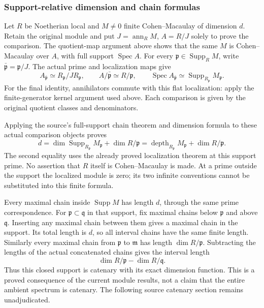 \subsubsection{Support-relative dimension and chain formulas}\label{algebra-proof-019-support-relative-dimension-and-chain-formulas}

Let \(R\) be Noetherian local and \(M\ne0\) finite Cohen--Macaulay of dimension \(d\). Retain the original module and put \(J=\operatorname{ann}_R M\), \(A=R/J\) solely to prove the comparison. The quotient-map argument above shows that the same \(M\) is Cohen--Macaulay over \(A\), with full support \(\operatorname{Spec}A\). For every \(\mathfrak p\in\operatorname{Supp}_R M\), write \(\bar{\mathfrak p}=\mathfrak p/J\). The actual prime and localization maps give \[
 A_{\bar{\mathfrak p}}\simeq R_{\mathfrak p}/JR_{\mathfrak p},\qquad
 A/\bar{\mathfrak p}\simeq R/\mathfrak p,\qquad
 \operatorname{Spec}A_{\bar{\mathfrak p}}\simeq
 \operatorname{Supp}_{R_{\mathfrak p}}M_{\mathfrak p}.
\] For the final identity, annihilators commute with this flat localization: apply the finite-generator kernel argument used above. Each comparison is given by the original quotient classes and denominators.

Applying the source's full-support chain theorem and dimension formula to these actual comparison objects proves \[
 d=\dim\operatorname{Supp}_{R_{\mathfrak p}}M_{\mathfrak p}
       +\dim R/\mathfrak p
   =\operatorname{depth}_{R_{\mathfrak p}}M_{\mathfrak p}
       +\dim R/\mathfrak p .
\] The second equality uses the already proved localization theorem at this support prime. No assertion that \(R\) itself is Cohen--Macaulay is made. At a prime outside the support the localized module is zero; its two infinite conventions cannot be substituted into this finite formula.

Every maximal chain inside \(\operatorname{Supp}M\) has length \(d\), through the same prime correspondence. For \(\mathfrak p\subset\mathfrak q\) in that support, fix maximal chains below \(\mathfrak p\) and above \(\mathfrak q\). Inserting any maximal chain between them gives a maximal chain in the support. Its total length is \(d\), so all interval chains have the same finite length. Similarly every maximal chain from \(\mathfrak p\) to \(\mathfrak m\) has length \(\dim R/\mathfrak p\). Subtracting the lengths of the actual concatenated chains gives the interval length \[
 \dim R/\mathfrak p-\dim R/\mathfrak q.
\] Thus this closed support is catenary with its exact dimension function. This is a proved consequence of the current module results, not a claim that the entire ambient spectrum is catenary. The following source catenary section remains unadjudicated.

